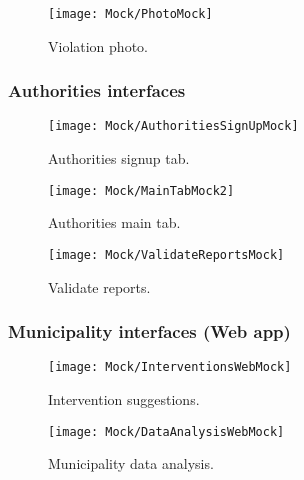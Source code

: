 \begin{figure}[H]
	\centering
	\begin{minipage}[b]{0.99\linewidth}
		\texttt{[image: Mock/PhotoMock]}
		\caption{Violation photo.}
	\end{minipage}
\end{figure}

\subsubsection{Authorities interfaces}

\begin{figure}[H]
	\centering
	\begin{minipage}[b]{0.38\linewidth}
	    \texttt{[image: Mock/AuthoritiesSignUpMock]}
	    \caption{\small Authorities signup tab.}
	\end{minipage}
	\begin{minipage}[b]{0.38\linewidth}
		\texttt{[image: Mock/MainTabMock2]}
		\caption{\small Authorities main tab.}
		\label{mainTab2}
	\end{minipage}
	\begin{minipage}[b]{0.38\linewidth}
		\texttt{[image: Mock/ValidateReportsMock]}
		\caption{\small Validate reports.}
	\end{minipage}
\end{figure}

\subsubsection{Municipality interfaces (Web app)}

\begin{figure}[H]
	\centering
	\begin{minipage}[b]{0.8\linewidth}
	    \texttt{[image: Mock/InterventionsWebMock]}
	    \caption{Intervention suggestions.}
	\end{minipage}
\end{figure}

\begin{figure}[H]
	\centering
	\begin{minipage}[b]{0.8\linewidth}
		\texttt{[image: Mock/DataAnalysisWebMock]}
		\caption{Municipality data analysis.}
	\end{minipage}
\end{figure}






